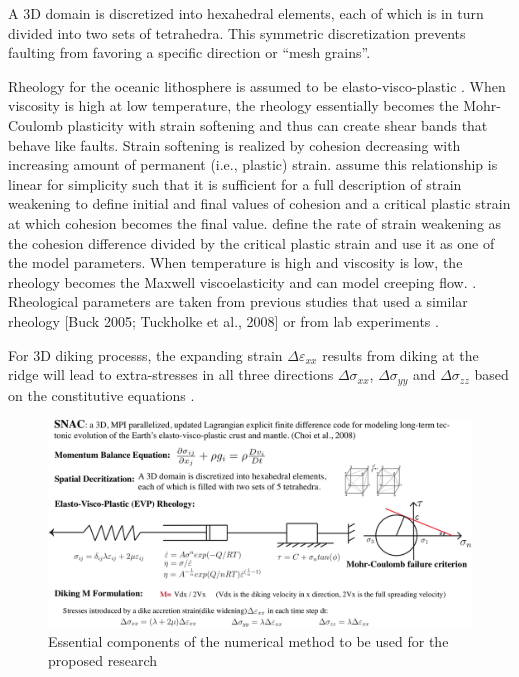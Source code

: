 A 3D domain is discretized into hexahedral elements, each of which is in turn divided into two sets of tetrahedra. This symmetric discretization prevents faulting from favoring a specific direction or ``mesh grains''. 

Rheology for the oceanic lithosphere is assumed to be elasto-visco-plastic . When viscosity is high at low temperature, the rheology essentially becomes the Mohr-Coulomb plasticity with strain softening and thus can create shear bands that behave like faults. Strain softening is realized by cohesion decreasing with increasing amount of permanent (i.e., plastic) strain.  assume this relationship is linear for simplicity such that it is sufficient for a full description of strain weakening to define initial and final values of cohesion and a critical plastic strain at which cohesion becomes the final value.  define the rate of strain weakening as the cohesion difference divided by the critical plastic strain and use it as one of the model parameters. When temperature is high and viscosity is low, the rheology becomes the Maxwell viscoelasticity and can model creeping flow. . Rheological parameters are taken from previous studies that used a similar rheology [Buck 2005; Tuckholke et al., 2008] or from lab experiments \citep[e.g.,][]{Kirby1987}. 

For 3D diking processs, the expanding strain $\Delta\varepsilon_{xx}$ results from diking at the ridge will lead to extra-stresses in all three directions $\Delta\sigma_{xx}$, $\Delta\sigma_{yy}$ and $\Delta\sigma_{zz}$ based on the  constitutive equations .

\begin{figure}[H]
 \centering
  \includegraphics[width=1.0\textwidth]{fig_Methods7_3.png}
 \caption{\small{Essential components of the numerical method to be used for the proposed research}}
 \label{fig_Methods7_3}
\end{figure}

